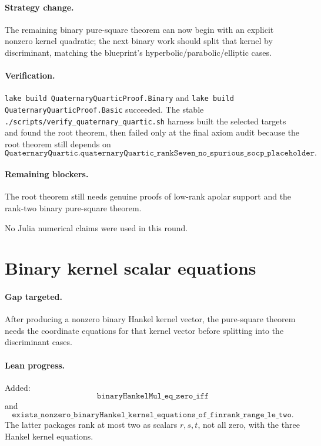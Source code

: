 \documentclass[11pt]{article}
\begin{document}
\paragraph{Strategy change.}
The remaining binary pure-square theorem can now begin with an explicit
nonzero kernel quadratic; the next binary work should split that kernel by
discriminant, matching the blueprint's hyperbolic/parabolic/elliptic cases.

\paragraph{Verification.}
\texttt{lake build QuaternaryQuarticProof.Binary} and
\texttt{lake build QuaternaryQuarticProof.Basic} succeeded.  The stable
\texttt{./scripts/verify\_quaternary\_quartic.sh} harness built the selected
targets and found the root theorem, then failed only at the final axiom audit
because the root theorem still depends on
\[
\texttt{QuaternaryQuartic.quaternaryQuartic\_rankSeven\_no\_spurious\_socp\_placeholder}.
\]

\paragraph{Remaining blockers.}
The root theorem still needs genuine proofs of low-rank apolar support and the
rank-two binary pure-square theorem.

No Julia numerical claims were used in this round.

\section*{Binary kernel scalar equations}

\paragraph{Gap targeted.}
After producing a nonzero binary Hankel kernel vector, the pure-square theorem
needs the coordinate equations for that kernel vector before splitting into
the discriminant cases.

\paragraph{Lean progress.}
Added:
\[
\texttt{binaryHankelMul\_eq\_zero\_iff}
\]
and
\[
\texttt{exists\_nonzero\_binaryHankel\_kernel\_equations\_of\_finrank\_range\_le\_two}.
\]
The latter packages rank at most two as scalars \(r,s,t\), not all zero, with
the three Hankel kernel equations.
\end{document}
